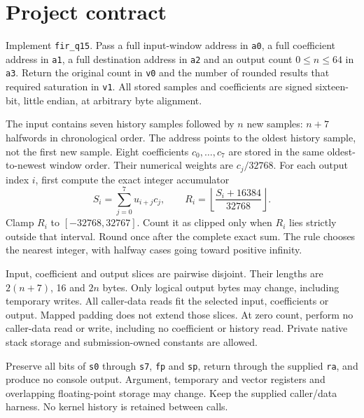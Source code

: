 \section*{Project contract}
Implement \texttt{fir\_q15}. Pass a full input-window address in \texttt{a0}, a full
coefficient address in \texttt{a1}, a full destination address in \texttt{a2} and an
output count \(0\leq n\leq64\) in \texttt{a3}. Return the original count in
\texttt{v0} and the number of rounded results that required saturation in \texttt{v1}.
All stored samples and coefficients are signed sixteen-bit, little endian, at arbitrary
byte alignment.

The input contains seven history samples followed by \(n\) new samples: \(n+7\)
halfwords in chronological order. The address points to the oldest history sample,
not the first new sample. Eight coefficients \(c_0,\ldots,c_7\) are stored in the
same oldest-to-newest window order. Their numerical weights are \(c_j/32768\).
For each output index \(i\), first compute the exact integer accumulator
\[
 S_i=\sum_{j=0}^{7}u_{i+j}c_j,
 \qquad R_i=\left\lfloor\frac{S_i+16384}{32768}\right\rfloor.
\]
Clamp \(R_i\) to \([-32768,32767]\). Count it as clipped only when \(R_i\) lies
strictly outside that interval. Round once after the complete exact sum. The rule
chooses the nearest integer, with halfway cases going toward positive infinity.

Input, coefficient and output slices are pairwise disjoint. Their lengths are
\(2(n+7)\), 16 and \(2n\) bytes. Only logical output bytes may change, including
temporary writes. All caller-data reads fit the selected input, coefficients or output.
Mapped padding does not extend those slices. At zero count, perform no caller-data
read or write, including no coefficient or history read. Private native stack storage
and submission-owned constants are allowed.

Preserve all bits of \texttt{s0} through \texttt{s7}, \texttt{fp} and \texttt{sp},
return through the supplied \texttt{ra}, and produce no console output. Argument,
temporary and vector registers and overlapping floating-point storage may change.
Keep the supplied caller/data harness. No kernel history is retained between calls.
